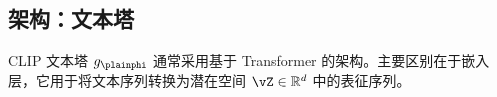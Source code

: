\documentclass[../../book-main_zh.tex]{subfiles}
\begin{document}


\subsection{架构：文本塔}
CLIP 文本塔 \(g_{\plainphi}\) 通常采用基于 Transformer 的架构。主要区别在于嵌入层，它用于将文本序列转换为潜在空间 \(\vZ \in \mathbb{R}^{d}\) 中的表征序列。
\end{document}
